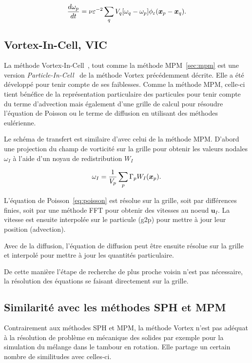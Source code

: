 \begin{equation*}
    \frac{d \omega_p}{dt} = \nu \varepsilon^{-2} \sum_q V_q [\omega_q - \omega_p] \phi_\varepsilon(\bm{x}_p - \bm{x}_q).
\end{equation*}

\subsection{Vortex-In-Cell, VIC}

La méthode Vortex-In-Cell~\cite{christiansen_1973}, tout comme la méthode MPM~\ref{sec:mpm} est une version \textit{Particle-In-Cell}~\cite{birdsall_1969} de la méthode Vortex précédemment décrite. Elle a été développé pour tenir compte de ses faiblesses. Comme la méthode MPM, celle-ci tient bénéfice de la représentation particulaire des particules pour tenir compte du terme d'advection mais également d'une grille de calcul pour résoudre l'équation de Poisson ou le terme de diffusion en utilisant des méthodes eulérienne.

Le schéma de transfert est similaire d'avec celui de la méthode MPM. D'abord une projection du champ de vorticité sur la grille pour obtenir les valeurs nodales $\omega_I$ à l'aide d'un noyau de redistribution $W_I$

\begin{equation*}
    \omega_I = \frac{1}{V_p}\sum_p \Gamma_p W_I(\bm{x}_p).
\end{equation*}

L'équation de Poisson~\ref{eq:poisson} est résolue sur la grille, soit par différences finies, soit par une méthode FFT pour obtenir des vitesses au noeud $\bm u_I$. La vitesse est ensuite interpolée sur le particule (g2p) pour mettre à jour leur position (advection).

Avec de la diffusion, l'équation de diffusion peut être ensuite résolue sur la grille et interpolé pour mettre à jour les quantités particulaire.

De cette manière l'étape de recherche de plus proche voisin n'est pas nécessaire, la résolution des équations se faisant directement sur la grille.

\subsection{Similarité avec les méthodes SPH et MPM}

Contrairement aux méthodes SPH et MPM, la méthode Vortex n'est pas adéquat à la résolution de problème en mécanique des solides par exemple pour la simulation du mélange dans le tambour en rotation. Elle partage un certain nombre de similitudes avec celles-ci.


